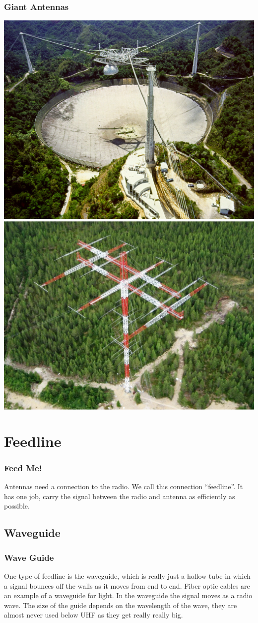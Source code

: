 \documentclass[10pt, handout]{beamer}
\begin{document}
\begin{frame}
\frametitle{Giant Antennas}
\includegraphics[width=.49\textwidth]{arecibo.jpg}
\includegraphics[width=.49\textwidth]{160myagi.jpg}
\end{frame}

\section{Feedline}

\begin{frame}
\frametitle{Feed Me!}
Antennas need a connection to the radio. We call this connection ``feedline''. It has one job, carry the signal between the radio and antenna as efficiently as possible.
\end{frame}

\subsection{Waveguide}

\begin{frame}
\frametitle{Wave Guide}
One type of feedline is the waveguide, which is really just a hollow tube in which a signal bounces off the walls as it moves from end to end. Fiber optic cables are an example of a waveguide for light. In the waveguide the signal moves as a radio wave. The size of the guide depends on the wavelength of the wave, they are almost never used below UHF as they get really really big. 
\end{frame}
\end{document}
